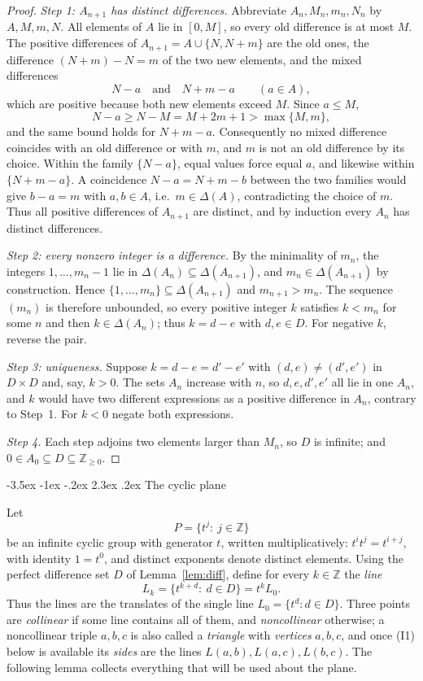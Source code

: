 \documentclass[11pt]{article}
\makeatletter
\renewcommand\section{\@startsection{section}{1}{\z@}
  {-3.5ex \@plus -1ex \@minus -.2ex}
  {2.3ex \@plus.2ex}
  {\normalfont\bfseries}}
\theoremstyle{plain}
\theoremstyle{definition}
\newcommand{\Z}{\mathbb{Z}}
\makeatother
\begin{document}
\begin{proof}
\emph{Step 1: $A_{n+1}$ has distinct differences.}
Abbreviate $A_n,M_n,m_n,N_n$ by $A,M,m,N$.  All elements of $A$ lie in
$[0,M]$, so every old difference is at most $M$.  The positive
differences of $A_{n+1}=A\cup\{N,N+m\}$ are the old ones, the
difference $(N+m)-N=m$ of the two new elements, and the mixed
differences
\[
 N-a\quad\text{and}\quad N+m-a\qquad(a\in A),
\]
which are positive because both new elements exceed $M$.  Since
$a\leq M$,
\[
 N-a\geq N-M=M+2m+1>\max\{M,m\},
\]
and the same bound holds for $N+m-a$.  Consequently no mixed difference
coincides with an old difference or with $m$, and $m$ is not an old
difference by its choice.  Within the family $\{N-a\}$, equal values
force equal $a$, and likewise within $\{N+m-a\}$.  A coincidence
$N-a=N+m-b$ between the two families would give $b-a=m$ with
$a,b\in A$, i.e.\ $m\in\Delta(A)$, contradicting the choice of $m$.
Thus all positive differences of $A_{n+1}$ are distinct, and by
induction every $A_n$ has distinct differences.

\emph{Step 2: every nonzero integer is a difference.}
By the minimality of $m_n$, the integers $1,\dots,m_n-1$ lie in
$\Delta(A_n)\subseteq\Delta(A_{n+1})$, and $m_n\in\Delta(A_{n+1})$ by
construction.  Hence $\{1,\dots,m_n\}\subseteq\Delta(A_{n+1})$ and
$m_{n+1}>m_n$.  The sequence $(m_n)$ is therefore unbounded, so every
positive integer $k$ satisfies $k<m_n$ for some $n$ and then
$k\in\Delta(A_n)$; thus $k=d-e$ with $d,e\in D$.  For negative $k$,
reverse the pair.

\emph{Step 3: uniqueness.}
Suppose $k=d-e=d'-e'$ with $(d,e)\neq(d',e')$ in $D\times D$ and, say,
$k>0$.  The sets $A_n$ increase with $n$, so $d,e,d',e'$ all lie in one
$A_n$, and $k$ would have two different expressions as a positive
difference in $A_n$, contrary to Step~1.  For $k<0$ negate both
expressions.

\emph{Step 4.}  Each step adjoins two elements larger than $M_n$, so $D$
is infinite; and $0\in A_0\subseteq D\subseteq\Z_{\geq0}$.
\end{proof}

\section{The cyclic plane}\label{sec:plane}

Let
\[
 P=\{t^j:\ j\in\Z\}
\]
be an infinite cyclic group with generator $t$, written
multiplicatively: $t^it^j=t^{i+j}$, with identity $1=t^0$, and distinct
exponents denote distinct elements.  Using the perfect difference set
$D$ of Lemma~\ref{lem:diff}, define for every $k\in\Z$ the \emph{line}
\[
 L_k=\{t^{k+d}:\ d\in D\}=t^k L_0 .
\]
Thus the lines are the translates of the single line $L_0=\{t^d:d\in D\}$.
Three points are \emph{collinear} if some line contains all of them, and
\emph{noncollinear} otherwise; a noncollinear triple $a,b,c$ is also
called a \emph{triangle} with \emph{vertices} $a,b,c$, and once (I1)
below is available its \emph{sides} are the lines
$L(a,b),L(a,c),L(b,c)$.  The following lemma collects everything that
will be used about the plane.
\end{document}

